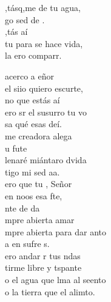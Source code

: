 \begin{cancion}%
	\begin{chorus}%
	,tásq,me de tu agua, \\
	go sed de .\\
	,tás aí\\
	tu para se hace vida,\\
	la ero comparr.\\
	\end{chorus}%
	acerco a eñor\\
	el siio quiero escurte,\\
	no que estás aí\\
	ero sr el susurro tu vo\\
	sa qué esas deí.\\
	me creadora  alega \\
	 u fute \\
	lenaré miántaro dvida\\
	tigo mi sed aa. \\
	ero que tu , Señor\\
	 en noos esa fte,\\
	nte de da\\
	mpre abierta  amar\\
	mpre abierta para dar anto\\
	a en sufre s. \\
	ero andar r tus ndas\\
	tirme libre y tspante\\
	o el agua que lma al seento\\
	o la tierra que el alimto.\\
\end{cancion}%
